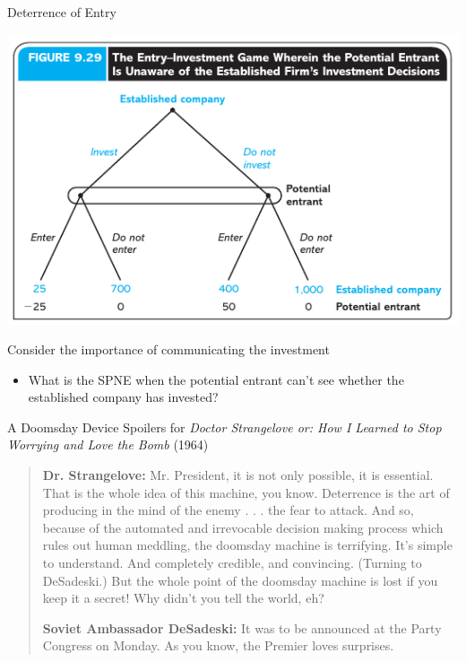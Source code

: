 \begin{frame}{Deterrence of Entry}
  \begin{center}
    \includegraphics[width=.7\textwidth]{figures/fig929.png} 
  \end{center}
  Consider the importance of communicating the investment
  \begin{itemize}
    \item What is the SPNE when the potential entrant can't see whether the established company has invested? 
  \end{itemize}
\end{frame}

\begin{frame}{A Doomsday Device}
  Spoilers for \textit{Doctor Strangelove or: How I Learned to Stop Worrying and Love the Bomb} (1964)
  \begin{quote}
    \footnotesize
    \textbf{Dr. Strangelove:} Mr. President, it is not only possible, it is essential. That is the whole idea of this machine, you know. Deterrence is the art of producing in the mind of the enemy . . . the fear to attack. And so, because of the automated and irrevocable decision making process which rules out human meddling, the doomsday machine is terrifying. It’s simple to understand. And completely credible, and convincing. (Turning to DeSadeski.) But the whole point of the doomsday machine is lost if you keep it a secret! Why didn’t you tell the world, eh?

    \textbf{Soviet Ambassador DeSadeski:} It was to be announced at the Party Congress on Monday. As you know, the Premier loves surprises.
  \end{quote}
\end{frame}
